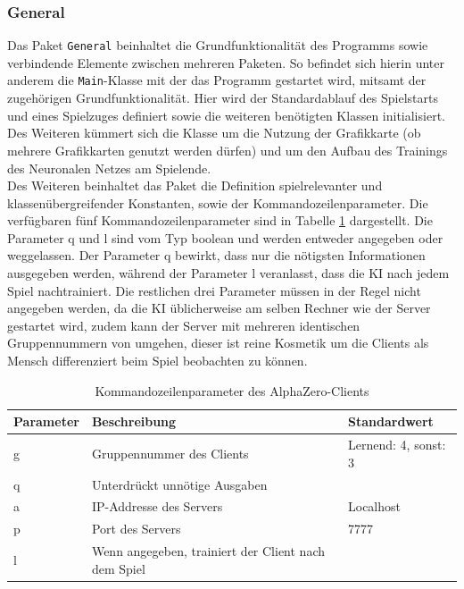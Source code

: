 \documentclass[12pt,a4paper]{article}
\begin{document}
\subsubsection{General}
Das Paket \texttt{General} beinhaltet die Grundfunktionalität des Programms sowie verbindende Elemente zwischen mehreren Paketen.
So befindet sich hierin unter anderem die \texttt{Main}-Klasse mit der das Programm gestartet wird, mitsamt der zugehörigen Grundfunktionalität. Hier wird der Standardablauf des Spielstarts und eines Spielzuges definiert sowie die weiteren benötigten Klassen initialisiert. Des Weiteren k\"{u}mmert sich die Klasse um die Nutzung der Grafikkarte (ob mehrere Grafikkarten genutzt werden d\"{u}rfen) und um den Aufbau des Trainings des Neuronalen Netzes am Spielende.\\
Des Weiteren beinhaltet das Paket die Definition spielrelevanter und klassenübergreifender Konstanten, sowie der Kommandozeilenparameter. Die verfügbaren fünf Kommandozeilenparameter sind in Tabelle \ref{tab:cmd_params} dargestellt. Die Parameter q und l sind vom Typ boolean und werden entweder angegeben oder weggelassen. Der Parameter q bewirkt, dass nur die nötigsten Informationen ausgegeben werden, während der Parameter l veranlasst, dass die KI nach jedem Spiel nachtrainiert. Die restlichen drei Parameter müssen in der Regel nicht angegeben werden, da die KI üblicherweise am selben Rechner wie der Server gestartet wird, zudem kann der Server mit mehreren identischen Gruppennummern von umgehen, dieser ist reine Kosmetik um die Clients als Mensch differenziert beim Spiel beobachten zu können.

\begin{table}
	\caption{Kommandozeilenparameter des AlphaZero-Clients}
	\label{tab:cmd_params}
	\begin{tabularx}{\textwidth}{ | l | X | l | }
		\hline
		Parameter & Beschreibung & Standardwert \\ \hline
		g & Gruppennummer des Clients & Lernend: 4, sonst: 3 \\ \hline
		q & Unterdrückt unnötige Ausgaben &  \\ \hline
		a & IP-Addresse des Servers & Localhost  \\ \hline
		p & Port des Servers & 7777 \\ \hline
		l & Wenn angegeben, trainiert der Client nach dem Spiel &  \\ \hline
	\end{tabularx}
\end{table}
\end{document}
